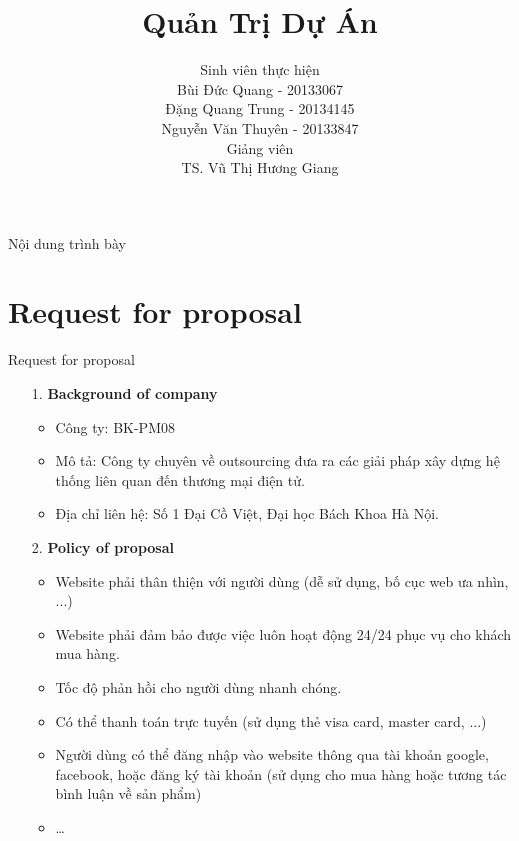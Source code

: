 \documentclass[compress]{beamer}
\title[]{Quản Trị Dự Án}
\author[Bùi Đức Quang, Đặng Quang Trung, Nguyễn Văn Thuyên]{
Sinh viên thực hiện\\
Bùi Đức Quang - 20133067\\
Đặng Quang Trung - 20134145\\
Nguyễn Văn Thuyên - 20133847 \\[0.4cm]
Giảng viên \\
TS. Vũ Thị Hương Giang
}
\begin{document}
 
\begin{frame}
\titlepage
\end{frame} 
  
\begin{frame}{Nội dung trình bày}
\tableofcontents
\end{frame}
\section{Request for proposal}
\begin{frame}{Request for proposal}
\begin{itemize}
\item[1. ] \textbf{Background of company}
\begin{itemize}
\item Công ty: BK-PM08
\item Mô tả: Công ty chuyên về outsourcing đưa ra các giải pháp xây dựng hệ thống liên quan đến thương mại điện tử.
\item Địa chỉ liên hệ: Số 1 Đại Cồ Việt, Đại học Bách Khoa Hà Nội.
\end{itemize}
\item[2. ] \textbf{Policy of proposal}
\begin{itemize}
\item Website phải thân thiện với người dùng (dễ sử dụng, bố cục web ưa nhìn, ...)
\item Website phải đảm bảo được việc luôn hoạt động 24/24 phục vụ cho khách mua hàng.
\item Tốc độ phản hồi cho người dùng nhanh chóng.
\item Có thể thanh toán trực tuyến (sử dụng thẻ visa card, master card, ...)
\item Người dùng có thể đăng nhập vào website thông qua tài khoản google, facebook, hoặc đăng ký tài khoản (sử dụng cho mua hàng hoặc tương tác bình luận về sản phẩm)
\item \ldots
\end{itemize}
\end{itemize}
\end{frame}
\end{document}

